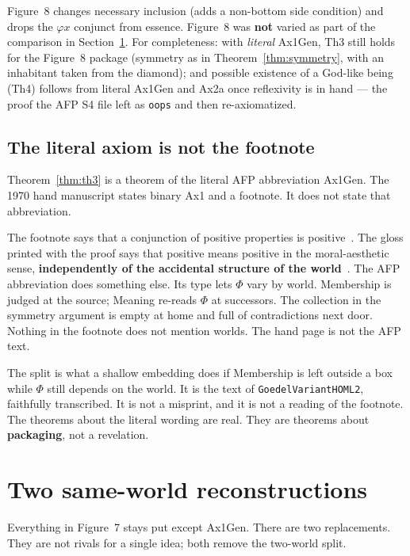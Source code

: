 \documentclass[11pt]{article}
\begin{document}
Figure~8 changes necessary inclusion (adds a non-bottom side condition) and drops the
\(\varphi x\) conjunct from essence. Figure~8 was \textbf{not} varied as part of the
comparison in Section~\ref{sec:reconstructions}. For completeness: with \emph{literal}
Ax1Gen, Th3 still holds for the Figure~8 package (symmetry as in Theorem~\ref{thm:symmetry},
with an inhabitant taken from the diamond); and possible existence of a God-like being
(Th4) follows from literal Ax1Gen and Ax2a once reflexivity is in hand --- the proof the
AFP S4 file left as \texttt{oops} and then re-axiomatized.

\subsection{The literal axiom is not the footnote}

Theorem~\ref{thm:th3} is a theorem of the literal AFP abbreviation Ax1Gen. The 1970 hand
manuscript states binary Ax1 and a footnote. It does not state that abbreviation.

The footnote says that a conjunction of positive properties is positive~\cite{Godel1995,Benz2021AFP}.
The gloss printed with the proof says that positive means positive in the moral-aesthetic
sense, \textbf{independently of the accidental structure of the world}~\cite{Godel1995}. The
AFP abbreviation does something else. Its type lets \(\Phi\) vary by world. Membership is
judged at the source; Meaning re-reads \(\Phi\) at successors. The collection in the
symmetry argument is empty at home and full of contradictions next door. Nothing in the
footnote does not mention worlds. The hand page is not the AFP text.

The split is what a shallow embedding does if Membership is left outside a box while
\(\Phi\) still depends on the world. It is the text of \texttt{GoedelVariantHOML2},
faithfully transcribed. It is not a misprint, and it is not a reading of the footnote. The
theorems about the literal wording are real. They are theorems about \textbf{packaging},
not a revelation.

\section{Two same-world reconstructions}
\label{sec:reconstructions}

Everything in Figure~7 stays put except Ax1Gen. There are two replacements. They are not
rivals for a single idea; both remove the two-world split.
\end{document}
